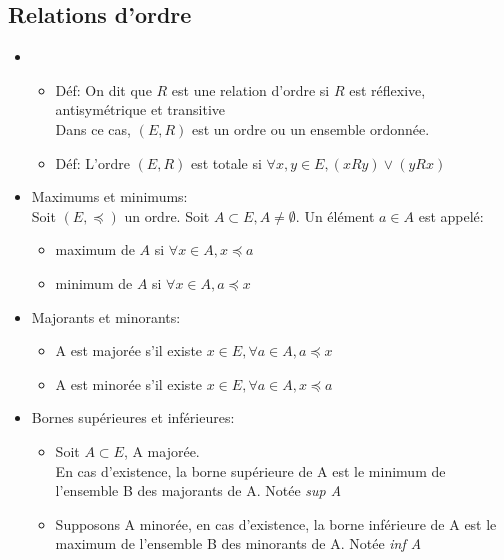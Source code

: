 \documentclass[fleqn]{article}
\theoremstyle{definition} \newtheorem*{defi}{D\'efinition}
\theoremstyle{plain} \newtheorem*{theo}{Th\'eor\`eme}
\begin{document}
\subsection{Relations d'ordre}
\begin{itemize}
	\item
		\begin{itemize}
			\item D\'ef: On dit que \(R\) est une relation d'ordre si \(R\) est r\'eflexive, antisym\'etrique et transitive \\
				Dans ce cas, \((E,R)\) est un ordre ou un ensemble ordonn\'ee.
			\item D\'ef: L'ordre \((E,R)\) est totale si \(\forall x,y \in E, (xRy) \lor (yRx)\)
		\end{itemize}
	\item Maximums et minimums: \\
		Soit \((E, \preceq)\) un ordre. Soit \(A \subset E, A \neq \emptyset\). Un \'el\'ement \(a \in A\) est appel\'e:
		\begin{itemize}
			\item maximum de \(A\) si \(\forall x \in A, x \preceq a\)
			\item minimum de \(A\) si \(\forall x \in A, a \preceq x\)
		\end{itemize}
	\item Majorants et minorants:
		\begin{itemize}
			\item A est major\'ee s'il existe \(x \in E, \forall a \in A, a \preceq x\)
			\item A est minor\'ee s'il existe \(x \in E, \forall a \in A, x \preceq a\)
		\end{itemize}
	\item Bornes sup\'erieures et inf\'erieures:
		\begin{itemize}
			\item Soit \(A \subset E\), A major\'ee. \\
			En cas d'existence, la borne sup\'erieure de A est le minimum de l'ensemble B des majorants de A. Not\'ee \emph{sup A}
			\item Supposons A minor\'ee, en cas d'existence, la borne inf\'erieure de A est le maximum de l'ensemble B des minorants de A. Not\'ee \emph{inf A} \\
		\end{itemize}
\end{itemize}
\end{document}
